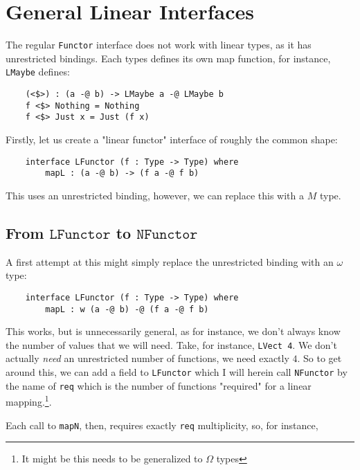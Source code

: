 \section{General Linear Interfaces}

The regular \verb|Functor| interface does not work with linear types, as it has unrestricted bindings.
Each types defines its own map function, for instance, \verb|LMaybe| defines: 

\begin{verbatim}
	(<$>) : (a -@ b) -> LMaybe a -@ LMaybe b
	f <$> Nothing = Nothing
	f <$> Just x = Just (f x)
\end{verbatim}

Firstly, let us create a "linear functor" interface of roughly the common shape:

\begin{verbatim}
	interface LFunctor (f : Type -> Type) where 
		mapL : (a -@ b) -> (f a -@ f b)
\end{verbatim}

This uses an unrestricted binding, however, we can replace this with a $M$ type. 

\subsection{From $\texttt{LFunctor}$ to $\texttt{NFunctor}$}

A first attempt at this might simply replace the unrestricted binding with an $\omega$ type:

\begin{verbatim}
	interface LFunctor (f : Type -> Type) where 
		mapL : w (a -@ b) -@ (f a -@ f b)
\end{verbatim}

This works, but is unnecessarily general, as for instance, we don't always know the number of values that we will need.
Take, for instance, \verb|LVect 4|. 
We don't actually \emph{need} an unrestricted number of functions, we need exactly $4$. 
So to get around this, we can add a field to \verb|LFunctor| which I will herein call \verb|NFunctor| by the name of \verb|req| which is the number of functions "required" for a linear mapping.\footnote{It might be this needs to be generalized to $\Omega$ types}.

Each call to \verb|mapN|, then, requires exactly \verb|req| multiplicity, so, for instance,